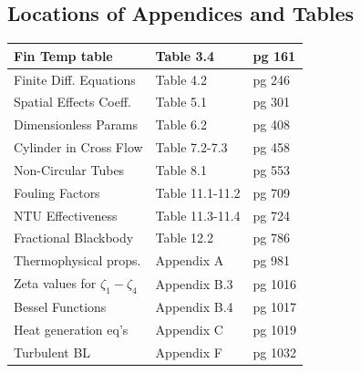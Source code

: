 \documentclass[twocolumn, 12pt]{article}
\begin{document}
\subsection*{Locations of Appendices and Tables}
    \begin{tabular}{|l|l|l|}
        \hline
        \rowcolor{lightgray}
        Fin Temp table & Table 3.4 & pg 161 \\
        \hline
        Finite Diff. Equations & Table 4.2 & pg 246\\
        \hline
        \rowcolor{lightgray}
        Spatial Effects Coeff. & Table 5.1 & pg 301 \\
        \hline
        Dimensionless Params & Table 6.2 & pg 408\\
        \hline
        \rowcolor{lightgray}
        Cylinder in Cross Flow & Table 7.2-7.3 & pg 458\\
        \hline
        Non-Circular Tubes & Table 8.1 & pg 553\\
        \hline
        \rowcolor{lightgray}
        Fouling Factors & Table 11.1-11.2 & pg 709\\
        \hline
        NTU Effectiveness & Table 11.3-11.4 & pg 724\\
        \hline
        \rowcolor{lightgray}
        Fractional Blackbody & Table 12.2 & pg 786\\
        \hline
        Thermophysical props. & Appendix A & pg 981\\
        \hline
        \rowcolor{lightgray}
        Zeta values for \(\zeta_1 - \zeta_4\) & Appendix B.3 & pg 1016\\
        \hline 
        Bessel Functions  & Appendix B.4 & pg 1017\\
        \hline 
        \rowcolor{lightgray}
        Heat generation eq's & Appendix C & pg 1019\\
        \hline
        Turbulent BL & Appendix F & pg 1032\\
        \hline
           
    \end{tabular}
\end{document}
